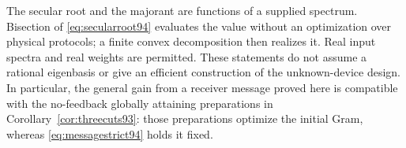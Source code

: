 The secular root and the majorant are functions of a supplied spectrum.
Bisection of \eqref{eq:secularroot94} evaluates the value without an
optimization over physical protocols; a finite convex decomposition
then realizes it.  Real input spectra and real weights are permitted.
These statements do not assume a rational eigenbasis or give an
efficient construction of the unknown-device design.  In particular,
the general gain from a receiver message proved here is compatible
with the no-feedback globally attaining preparations in
Corollary~\ref{cor:threecuts93}: those preparations optimize the initial
Gram, whereas \eqref{eq:messagestrict94} holds it fixed.
